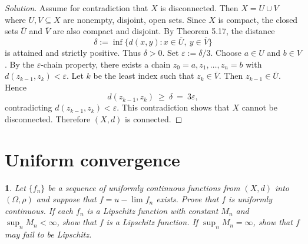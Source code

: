 \documentclass[12pt, a4paper]{report}
\theoremstyle{spaced}
\newtheorem{exercise}{}
\newcommand{\setexercise}[1]{\setcounter{exercise}{#1-1}}
\begin{document}
\begin{proof}[Solution]
	Assume for contradiction that $X$ is disconnected. Then
	$X=U\cup V$ where $U,V\subseteq X$ are nonempty, disjoint, open sets.
	Since $X$ is compact, the closed sets $\overline{U}$ and $\overline{V}$
	are also compact and disjoint. By Theorem 5.17, the distance
	\[
		\delta := \inf\{d(x,y): x\in \overline{U},\ y\in \overline{V}\}
	\]
	is attained and strictly positive. Thus $\delta>0$.
	Set $\varepsilon := \delta/3$. Choose $a\in U$ and $b\in V$.
	By the $\varepsilon$-chain property, there exists a chain
	$z_0=a, z_1, \dots, z_n=b$ with $d(z_{k-1},z_k)<\varepsilon$.
	Let $k$ be the least index such that $z_k \in \overline{V}$.
	Then $z_{k-1}\in \overline{U}$. Hence
	\[
		d(z_{k-1},z_k)\ \geq\ \delta \ =\ 3\varepsilon,
	\]
	contradicting $d(z_{k-1},z_k)<\varepsilon$.
	This contradiction shows that $X$ cannot be disconnected.
	Therefore $(X,d)$ is connected.
\end{proof}

\section{Uniform convergence}

\setexercise{1}
\begin{exercise}
	Let $\{f_n\}$ be a sequence of uniformly continuous functions from $(X,d)$ into $(\Omega,\rho)$
	and suppose that $f = u\!-\!\lim f_n$ exists. Prove that $f$ is uniformly continuous.
	If each $f_n$ is a Lipschitz function with constant $M_n$ and $\sup_n M_n < \infty$,
	show that $f$ is a Lipschitz function. If $\sup_n M_n = \infty$, show that $f$ may fail to be Lipschitz.
\end{exercise}
\end{document}
